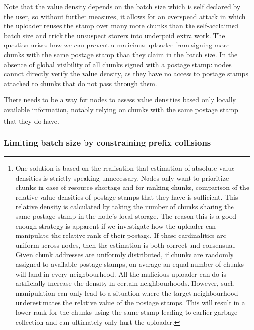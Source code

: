 Note that the value density depends on the batch size which is self declared by the user, so without further measures, it allows for an overspend attack in which the uploader reuses the stamp over many more chunks than the self-acclaimed batch size and trick the unsuspect storers into underpaid extra work. The question arises  
how we can prevent a malicious uploader from signing more chunks with the same postage stamp than they claim in the batch size. In the absence of global visibility of all chunks signed with a postage stamp: nodes cannot directly verify the value density, as they have no access to postage stamps attached to chunks that do not pass through them. 

There needs to be a way for nodes to assess value densities based only locally available information, notably relying on chunks with the same postage stamp that they do have.%
%
\footnote{One solution is based on the realisation that estimation of absolute value densities is strictly speaking unnecessary. Nodes only want to prioritize chunks in case of resource shortage and for ranking chunks, comparison of the relative value densities of postage stamps that they have is sufficient.  This relative density is calculated by taking the number of chunks sharing the same postage stamp in the node's local storage. The reason this is a good enough strategy is apparent if we investigate how the uploader can manipulate the relative rank of their postage. If these cardinalities are uniform across nodes, then the estimation is both correct and consensual. Given chunk addresses are uniformly distributed, if chunks are randomly assigned to available postage stamps, on average an equal number of chunks will land in every neighbourhood. All the malicious uploader can do is artificially increase the density in certain neighbourhoods. However, such  manipulation can only lead to a situation where the target neighbourhood underestimates the relative value of the postage stamps. This will result in a lower rank for the chunks using the same stamp leading to earlier garbage collection and can ultimately only  hurt  the uploader.}

\subsubsection{Limiting batch size by constraining prefix collisions}


